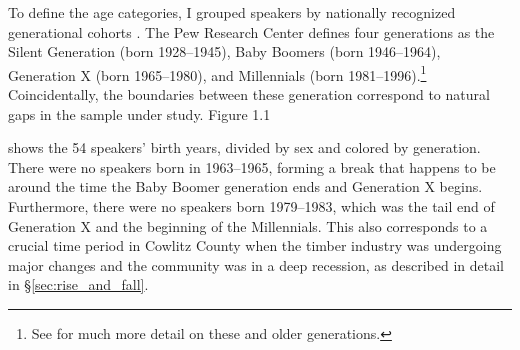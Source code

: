 To define the age categories, I grouped speakers by nationally recognized generational cohorts \citet[cf.][]{donofrio_etal_2019}. The Pew Research Center defines four generations as the Silent Generation (born 1928–1945), Baby Boomers (born 1946–1964), Generation X (born 1965–1980), and Millennials (born 1981–1996).\footnote{See \citep{strauss_howe_1991} for much more detail on these and older generations.} Coincidentally, the boundaries between these generation correspond to natural gaps in the sample under study. Figure 1.1
\addtocounter{figure}{1} %
shows the 54 speakers' birth years, divided by sex and colored by generation. There were no speakers born in 1963–1965, forming a break that happens to be around the time the Baby Boomer generation ends and Generation X begins. Furthermore, there were no speakers born 1979–1983, which was the tail end of Generation X and the beginning of the Millennials. This also corresponds to a crucial time period in Cowlitz County when the timber industry was undergoing major changes and the community was in a deep recession, as described in detail in \S\ref{sec:rise_and_fall}.

